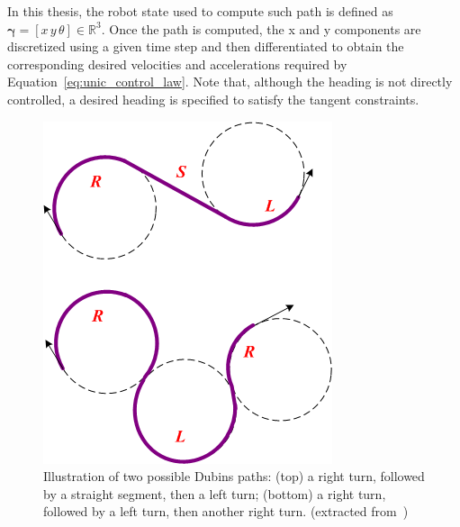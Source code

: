 In this thesis, the robot state used to compute such path is defined as $\boldsymbol{\gamma} = [x \, y \, \theta] \in \mathbb{R}^3$.
Once the path is computed, the x and y components are discretized using a given time step and then differentiated to obtain the corresponding desired velocities and accelerations required by Equation~\ref{eq:unic_control_law}.
Note that, although the heading is not directly controlled, a desired heading is specified to satisfy the tangent constraints.

\begin{figure} [t]
  \centering
  \includegraphics[width=0.4\linewidth]{figures/models/dubins.png} 
  \caption{Illustration of two possible Dubins paths: (top) a right turn, followed by a straight segment, then a left turn; (bottom) a right turn, followed by a left turn, then another right turn. (extracted from~\cite{cFigDubins})}%
  \label{fig:dubins}%
\end{figure}